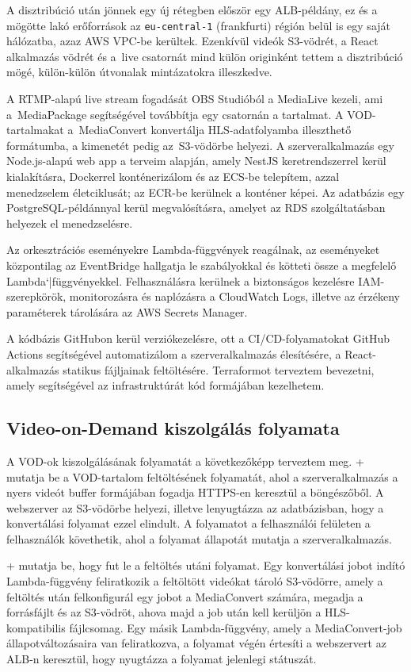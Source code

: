 A disztribúció után jönnek egy új rétegben először egy ALB-példány, ez és a mögötte lakó erőforrások az \verb|eu-central-1| (frankfurti) régión belül is egy saját hálózatba, azaz AWS VPC-be kerültek. Ezenkívül videók S3-vödrét, a React alkalmazás vödrét és a~live csatornát mind külön originként tettem a disztribúció mögé, külön-külön útvonalak mintázatokra illeszkedve.

A RTMP-alapú live stream fogadását OBS Studióból a MediaLive kezeli, ami a~MediaPackage segítségével továbbítja egy csatornán a tartalmat. A VOD-tartalmakat a~MediaConvert konvertálja HLS-adatfolyamba illeszthető formátumba, a kimenetét pedig az~S3\leavevmode\hbox{-}vödörbe helyezi. A szerveralkalmazás egy Node.js-alapú web app a terveim alapján, amely NestJS keretrendszerrel kerül kialakításra, Dockerrel konténerizálom és az ECS-be telepítem, azzal menedzselem életciklusát; az ECR-be kerülnek a konténer képei. Az adatbázis egy PostgreSQL-példánnyal kerül megvalósításra, amelyet az RDS szolgáltatásban helyezek el menedzselésre.

Az orkesztrációs eseményekre Lambda-függvények reagálnak, az eseményeket központilag az EventBridge hallgatja le szabályokkal és kötteti össze a megfelelő Lambda`|függvényekkel. Felhasználásra kerülnek a biztonságos kezelésre IAM-szerepkörök, monitorozásra és naplózásra a CloudWatch Logs, illetve az érzékeny paraméterek tárolására az AWS Secrets Manager.

A kódbázis GitHubon kerül verziókezelésre, ott a CI/CD-folyamatokat GitHub Actions segítségével automatizálom a szerveralkalmazás élesítésére, a React-alkalmazás statikus fájljainak feltöltésére. Terraformot terveztem bevezetni, amely segítségével az infrastruktúrát kód formájában kezelhetem.

\subsection{Video-on-Demand kiszolgálás folyamata}

A VOD-ok kiszolgálásának folyamatát a következőképp terveztem meg. \Az+ mutatja be a VOD-tartalom feltöltésének folyamatát, ahol a szerveralkalmazás a nyers videót buffer formájában fogadja HTTPS-en keresztül a böngészőből. A webszerver az S3-vödörbe helyezi, illetve lenyugtázza az adatbázisban, hogy a konvertálási folyamat ezzel elindult. A folyamatot a felhasználói felületen a felhasználók követhetik, ahol a folyamat állapotát mutatja a szerveralkalmazás.

\Az+ mutatja be, hogy fut le a feltöltés utáni folyamat. Egy konvertálási jobot indító Lambda-függvény feliratkozik a feltöltött videókat tároló S3-vödörre, amely a feltöltés után felkonfigurál egy jobot a MediaConvert számára, megadja a forrásfájlt és az S3-vödröt, ahova majd a job után kell kerüljön a HLS-kompatibilis fájlcsomag. Egy másik Lambda-függvény, amely a MediaConvert-job állapotváltozásaira van feliratkozva, a folyamat végén értesíti a webszervert az ALB-n keresztül, hogy nyugtázza a folyamat jelenlegi státuszát.

